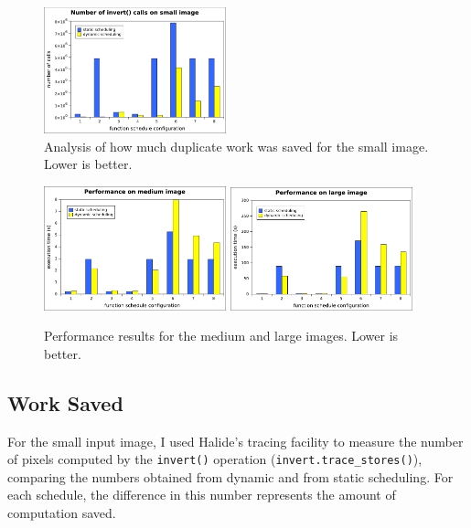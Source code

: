 \documentclass{article}
\begin{document}
\begin{figure}[h]
	\begin{center}
	\includegraphics[width=0.47\textwidth]{graphs/small.pdf}
	\end{center}
	\caption{Analysis of how much duplicate work was saved for the small image. Lower is better.}
	\label{fig:graph-trace}
\end{figure}
\begin{figure}[h]
	\begin{center}
	\includegraphics[width=0.47\textwidth]{graphs/medium.pdf} \quad
	\includegraphics[width=0.47\textwidth]{graphs/large.pdf}
	\end{center}
	\caption{Performance results for the medium and large images. Lower is better.}
	\label{fig:graph-perf}
\end{figure}

\subsection{Work Saved}

For the small input image, I used Halide's tracing facility to measure the number of pixels computed by the \texttt{invert()} operation (\texttt{invert.trace\_stores()}), comparing the numbers obtained from dynamic and from static scheduling. For each schedule, the difference in this number represents the amount of computation saved.
\end{document}
